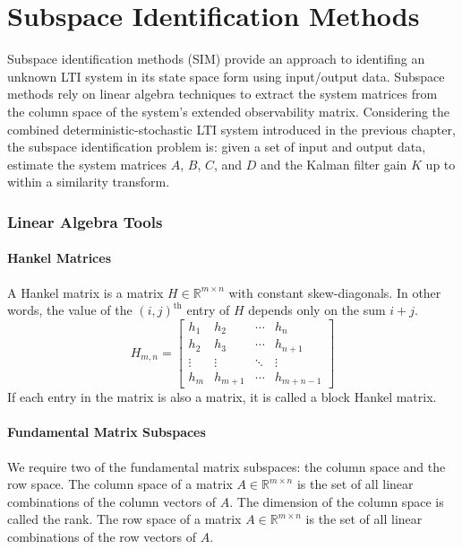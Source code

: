 \chapter{Subspace Identification Methods}
Subspace identification methods (SIM) provide an approach to identifing an unknown LTI system in its state space form using input/output data. Subspace methods rely on linear algebra techniques to extract the system matrices from the column space of the system's extended observability matrix. Considering the combined deterministic-stochastic LTI system introduced in the previous chapter, the subspace identification problem is: given a set of input and output data, estimate the system matrices $A$, $B$, $C$, and $D$ and the Kalman filter gain $K$ up to within a similarity transform. 




\subsection{Linear Algebra Tools}

\subsubsection*{Hankel Matrices}
A Hankel matrix is a matrix $H \in \mathbb{R}^{m\times n}$ with constant skew-diagonals. In other words, the value of the $(i, j)^{\mbox{th}}$ entry of $H$ depends only on the sum $i + j$.
\begin{equation*}
H_{m,n} = \begin{bmatrix}
h_1 & h_2 & \cdots & h_n\\
h_2 & h_3 & \cdots & h_{n+1}\\
\vdots & \vdots & \ddots & \vdots\\
h_m & h_{m+1} & \cdots & h_{m+n-1}
\end{bmatrix}
\end{equation*}
If each entry in the matrix is also a matrix, it is called a block Hankel matrix.


\subsubsection*{Fundamental Matrix Subspaces}
We require two of the fundamental matrix subspaces: the column space and the row space. The column space of a matrix $A \in \mathbb{R}^{m\times n}$ is the set of all linear combinations of the column vectors of $A$. The dimension of the column space is called the rank. The row space of a matrix $A \in \mathbb{R}^{m\times n}$ is the set of all linear combinations of the row vectors of $A$.


